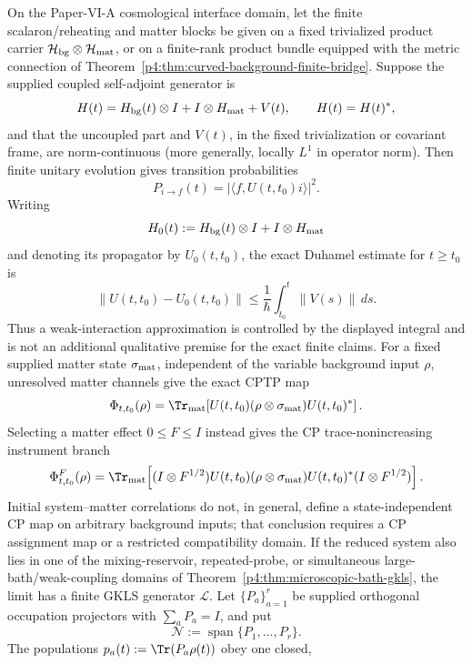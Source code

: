 \documentclass[12pt,a4paper]{article}
\begin{document}
\begin{theorem}
\label{p4:thm:finite-reheating-interface}
On the Paper-VI-A cosmological interface domain, let the finite
scalaron/reheating and matter blocks be given on a fixed trivialized product
carrier \(\mathcal H_{\rm bg}\otimes\mathcal H_{\rm mat}\), or on a
finite-rank product bundle equipped with the metric connection of
Theorem~\ref{p4:thm:curved-background-finite-bridge}.  Suppose the supplied
coupled self-adjoint generator is
\[
H(t)=H_{\rm bg}(t)\otimes I+I\otimes H_{\rm mat}+V(t),
\qquad
H(t)=H(t)^*,
\]
and that the uncoupled part and \(V(t)\), in the fixed trivialization or
covariant frame, are norm-continuous (more generally, locally \(L^1\) in
operator norm).
Then finite unitary evolution gives transition probabilities
\[
P_{i\to f}(t)=\left|\langle f,U(t,t_0)i\rangle\right|^2.
\]
Writing
\[
H_0(t):=H_{\rm bg}(t)\otimes I+I\otimes H_{\rm mat}
\]
and denoting its propagator by \(U_0(t,t_0)\), the exact Duhamel estimate for
\(t\ge t_0\) is
\begin{equation}
\label{p4:eq:reheating-duhamel-bound}
\bigl\|U(t,t_0)-U_0(t,t_0)\bigr\|
\le
\frac1{\hbar}\int_{t_0}^{t}\|V(s)\|\,ds .
\end{equation}
Thus a weak-interaction approximation is controlled by the displayed
integral and is not an additional qualitative premise for the exact finite
claims.
For a fixed supplied matter state \(\sigma_{\rm mat}\), independent of the
variable background input \(\rho\), unresolved matter channels give the
exact CPTP map
\[
\Phi_{t,t_0}(\rho)
=
\Tr_{\rm mat}\!\left[
U(t,t_0)(\rho\otimes\sigma_{\rm mat})U(t,t_0)^*
\right].
\]
Selecting a matter effect \(0\le F\le I\) instead gives the CP
trace-nonincreasing instrument branch
\[
\Phi^F_{t,t_0}(\rho)
=
\Tr_{\rm mat}\!\left[
(I\otimes F^{1/2})U(t,t_0)(\rho\otimes\sigma_{\rm mat})U(t,t_0)^*
(I\otimes F^{1/2})
\right].
\]
Initial system--matter correlations do not, in general, define a
state-independent CP map on arbitrary background inputs; that conclusion
requires a CP assignment map or a restricted compatibility domain.  If the
reduced system also lies in one of the
mixing-reservoir, repeated-probe, or simultaneous large-bath/weak-coupling
domains of Theorem~\ref{p4:thm:microscopic-bath-gkls}, the limit has a finite
GKLS generator \(\mathcal L\).  Let
\(\{P_a\}_{a=1}^r\) be supplied orthogonal occupation projectors with
\(\sum_aP_a=I\), and put
\[
\mathcal N:=\operatorname{span}\{P_1,\ldots,P_r\}.
\]
The populations \(p_a(t):=\Tr(P_a\rho(t))\) obey one closed,

\end{theorem}
\end{document}
